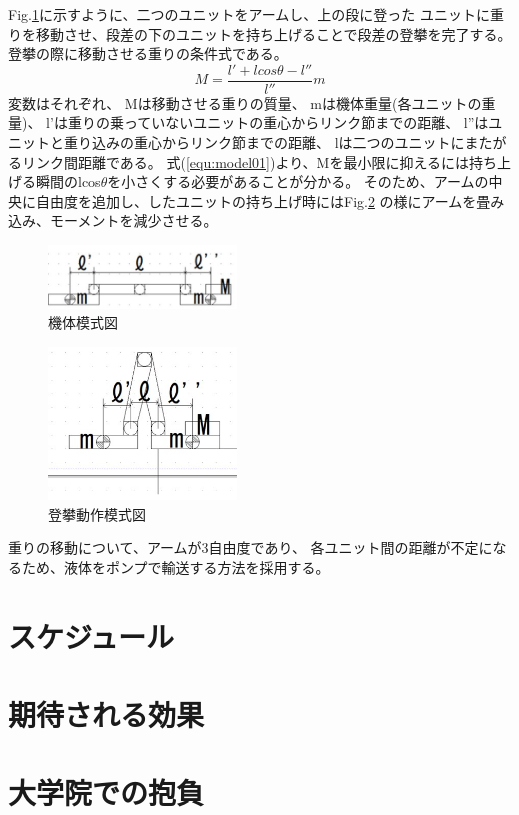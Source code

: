 \documentclass[dvipdfmx]{jsarticle}
\begin{document}
Fig.\ref{fig:model01}に示すように、二つのユニットをアームし、上の段に登った
ユニットに重りを移動させ、段差の下のユニットを持ち上げることで段差の登攀を完了する。
登攀の際に移動させる重りの条件式である。
\begin{equation}
  M=\frac{l'+lcos\theta-l''}{l''}m
\label{equ:model01}
\end{equation}
変数はそれぞれ、 
Mは移動させる重りの質量、
mは機体重量(各ユニットの重量)、
l'は重りの乗っていないユニットの重心からリンク節までの距離、
l''はユニットと重り込みの重心からリンク節までの距離、
lは二つのユニットにまたがるリンク間距離である。
式(\ref*{equ:model01})より、Mを最小限に抑えるには持ち上げる瞬間のlcos$\theta$を小さくする必要があることが分かる。
そのため、アームの中央に自由度を追加し、したユニットの持ち上げ時にはFig.\ref{fig:model02}
の様にアームを畳み込み、モーメントを減少させる。
\begin{figure}[H]
  \centering
  \includegraphics[width=50mm]{image/model01.jpg}
  \caption{機体模式図}
\label{fig:model01}
\end{figure}
\begin{figure}[H]
  \centering
  \includegraphics[width=50mm]{image/model02.jpg}
  \caption{登攀動作模式図}
\label{fig:model02}
\end{figure}

重りの移動について、アームが3自由度であり、
各ユニット間の距離が不定になるため、液体をポンプで輸送する方法を採用する。

\section{スケジュール}
\section{期待される効果}
\section{大学院での抱負}
\end{document}
